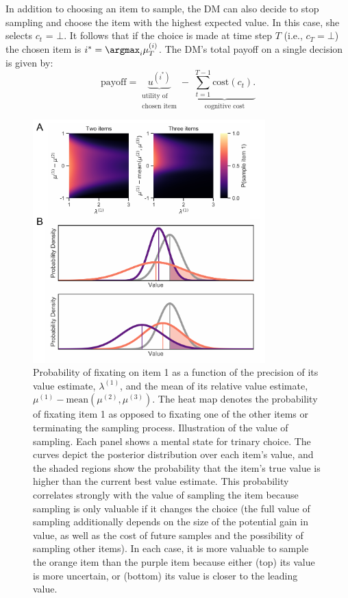 In addition to choosing an item to sample, the DM can also decide
to stop sampling and choose the item with the highest expected value. In this case, she selects $c_t$ = $\bot$. It follows that if the choice is made at time step $T$ (i.e., $c_T = \bot$) the chosen item is $i^* = \argmax_i \mu_T^{(i)}$. The DM's total payoff on a single decision is given by:
\begin{equation}
  \label{eq:objective}
  \text{payoff} = 
        \underbrace{u^{(i^*)}}_{
    \substack{\text{utility of} \\ \text{chosen item}}
  } -\;
  \underbrace{\sum_{t=1}^{T-1}\text{cost}(c_t).}_\text{cognitive cost}
\end{equation}

\begin{figure}[tb!]
  \centering
  \includegraphics[width=0.8\textwidth]{figs/attention/Fig2.pdf}
  \caption{
   Probability of fixating on item 1 as a function of the precision of its value estimate, $\lambda^{(1)}$, and the mean of its relative value estimate, $\mu^{(1)}-\mathrm{mean}(\mu^{(2)},\mu^{(3)})$. The heat map denotes the probability of fixating item 1 as opposed to fixating one of the other items or terminating the sampling process.
   Illustration of the value of sampling. Each panel shows a mental state for trinary choice. The curves depict the posterior distribution over each item's value, and the shaded regions show the probability that the item's true value is higher than the current best value estimate. This probability correlates strongly with the value of sampling the item because sampling is only valuable if it changes the choice (the full value of sampling additionally depends on the size of the potential gain in value, as well as the cost of future samples and the possibility of sampling other items). In each case, it is more valuable to sample the orange item than the purple item because either (top) its value is more uncertain, or (bottom) its value is closer to the leading value.
  }
  \label{fig:attention2}
\end{figure}

